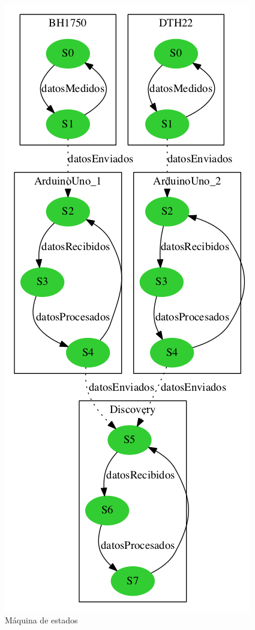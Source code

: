 \begin{center}
\begin{figure}[h]\label{fig:statemachine}
\includegraphics{images/maquina_estados.png}
\caption{M\'aquina de estados}
\end{figure}
\end{center}
